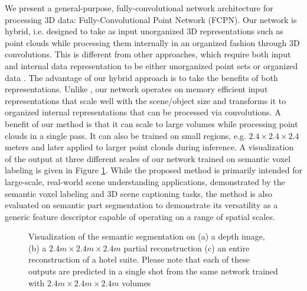 \documentclass[runningheads]{llncs}
\begin{document}
We present a general-purpose, fully-convolutional network architecture for processing 3D data: Fully-Convolutional Point Network (FCPN). Our network is hybrid, i.e. designed to take as input unorganized 3D representations such as point clouds while processing them internally in an organized fashion through 3D convolutions. This is different from other approaches, which require both input and internal data representation to be either unorganized point sets \cite{Qi2017,Qi2017_2,Manessi2018} or organized data \cite{Song2016,Dai2017}. The advantage of our hybrid approach is to take the benefits of both representations. Unlike \cite{Song2016,Dai2017}, our network operates on memory efficient input representations that scale well with the scene/object size and transforms it to organized internal representations that can be processed via convolutions. 
A benefit of our method is that it can scale to large volumes while processing point clouds in a single pass. It can also be trained on small regions, e.g. $2.4 \times 2.4 \times 2.4$ meters and later applied to larger point clouds during inference. A visualization of the output at three different scales of our network trained on semantic voxel labeling is given in Figure \ref{fig:scale_results}.
While the proposed method is primarily intended for large-scale, real-world scene understanding applications, demonstrated by the semantic voxel labeling and 3D scene captioning tasks, the method is also evaluated on semantic part segmentation to demonstrate its versatility as a generic feature descriptor capable of operating on a range of spatial scales.

\begin{figure}[h]%
    \centering
    \caption{Visualization of the semantic segmentation on (a) a depth image, (b) a $2.4m \times 2.4m \times 2.4m$ partial reconstruction (c) an entire reconstruction of a hotel suite. Please note that each of these outputs are predicted in a single shot from the same network trained with $2.4m \times 2.4m \times 2.4m$ volumes}%
    \label{fig:scale_results}%
\end{figure}
\end{document}
